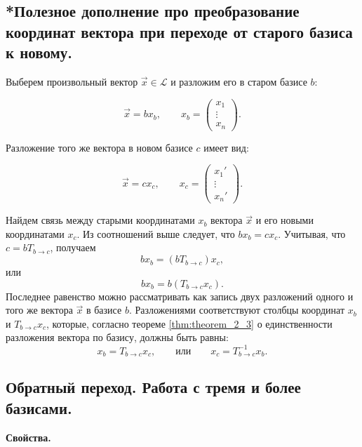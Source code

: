 \subsection{
    *Полезное дополнение про преобразование координат вектора при переходе от старого базиса к новому.
    \label{subsection:subsection_17_3}
}

Выберем произвольный вектор $\vec{x} \in \mathcal{L}$ и разложим его в старом базисе $b$:

$$\vec{x} = bx_b, \quad \quad x_b = \begin{pmatrix} x_1 \\ \vdots \\ x_n \end{pmatrix}.$$

Разложение того же вектора в новом базисе $c$ имеет вид:

$$\vec{x} = cx_c, \quad \quad x_c = \begin{pmatrix} x_1' \\ \vdots \\ x_n' \end{pmatrix}.$$

Найдем связь между старыми координатами $x_b$ вектора $\vec{x}$ и его новыми координатами $x_c$. Из соотношений выше следует, что $bx_b = cx_c$. Учитывая, что $c = bT_{b \to c}$, получаем 
$$bx_b = (bT_{b \to c})x_c,$$ или 
$$bx_b = b(T_{b \to c}x_c).$$ 
Последнее равенство можно рассматривать как запись двух разложений одного и того же вектора $\vec{x}$ в базисе $b$. Разложениями соответствуют столбцы координат $x_b$ и $T_{b \to c}x_c$, которые, согласно теореме \ref{thm:theorem_2_3} о единственности разложения вектора по базису, должны быть равны:
$$x_b = T_{b \to c}x_c, \quad \quad \text{или} \quad \quad x_c = T^{-1}_{b \to c}x_b.$$


\newpage


\subsection{
    Обратный переход. Работа с тремя и более базисами.
}

\textbf{Свойства.}

